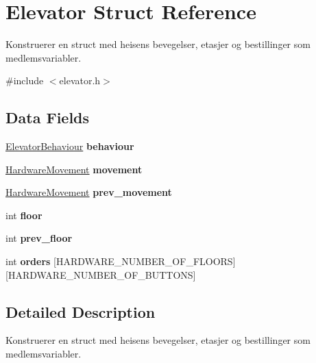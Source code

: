 \hypertarget{structElevator}{}\section{Elevator Struct Reference}
\label{structElevator}


Konstruerer en struct med heisens bevegelser, etasjer og bestillinger som medlemsvariabler.  




{\ttfamily \#include $<$elevator.\+h$>$}

\subsection*{Data Fields}
\begin{DoxyCompactItemize}
\item 
\mbox{\label{structElevator_a905fce854a1fd720c6716f1fe061c93a}} 
\hyperlink{elevator_8h_a386e600527947c8cc6a0fd6b483be5c6}{Elevator\+Behaviour} {\bfseries behaviour}
\item 
\mbox{\label{structElevator_ae0b46ddd93ba1049f856ec8db191f1be}} 
\hyperlink{hardware_8h_a2167c399a24df296afc432bcb88228af}{Hardware\+Movement} {\bfseries movement}
\item 
\mbox{\label{structElevator_a46714ab0cf409234ddd889a86b5c9626}} 
\hyperlink{hardware_8h_a2167c399a24df296afc432bcb88228af}{Hardware\+Movement} {\bfseries prev\+\_\+movement}
\item 
\mbox{\label{structElevator_a7cb6a37b507eed9b1b34c5e0899c9936}} 
int {\bfseries floor}
\item 
\mbox{\label{structElevator_ad89d5eb662090fc570ee8ab8c1c4c8ae}} 
int {\bfseries prev\+\_\+floor}
\item 
\mbox{\label{structElevator_ae0912ca21354f9cbfca78272a06cc549}} 
int {\bfseries orders} \mbox{[}H\+A\+R\+D\+W\+A\+R\+E\+\_\+\+N\+U\+M\+B\+E\+R\+\_\+\+O\+F\+\_\+\+F\+L\+O\+O\+RS\mbox{]}\mbox{[}H\+A\+R\+D\+W\+A\+R\+E\+\_\+\+N\+U\+M\+B\+E\+R\+\_\+\+O\+F\+\_\+\+B\+U\+T\+T\+O\+NS\mbox{]}
\end{DoxyCompactItemize}


\subsection{Detailed Description}
Konstruerer en struct med heisens bevegelser, etasjer og bestillinger som medlemsvariabler. 


